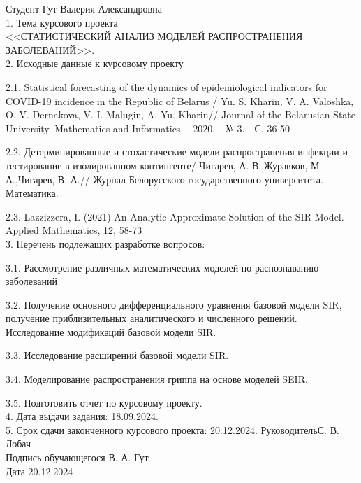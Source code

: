 \documentclass[a4paper, 14pt]{extreport}
\numberwithin{equation}{section}
\begin{document}
	\small{    Студент \quad Гут Валерия Александровна\\[2mm]
		1. Тема курсового проекта\\
		<<СТАТИСТИЧЕСКИЙ АНАЛИЗ МОДЕЛЕЙ РАСПРОСТРАНЕНИЯ ЗАБОЛЕВАНИЙ>>.\\[6mm]
		2. Исходные данные к курсовому проекту
		
		2.1. Statistical forecasting of the dynamics of epidemiological indicators for COVID-19 incidence in the Republic of Belarus / Yu. S. Kharin, V. A. Valoshka, O. V. Dernakova, V. I. Malugin, A. Yu. Kharin// Journal of the Belarusian State University. Mathematics and Informatics. - 2020. - № 3. - С. 36-50
		
		2.2. Детерминированные и стохастические модели распространения инфекции и тестирование в изолированном контингенте/ Чигарев, А. В.,Журавков, М. А.,Чигарев, В. А.// Журнал Белорусского государственного университета. Математика.
		
		2.3. Lazzizzera, I. (2021) An Analytic Approximate Solution of the SIR Model. Applied Mathematics, 12, 58-73\\[2mm]
		
		3. Перечень подлежащих разработке вопросов:
		
		3.1. Рассмотрение различных математических моделей по распознаванию  заболеваний
		
		3.2. Получение основного дифференциального уравнения базовой модели SIR, получение приблизительных аналитического и численного решений. Исследование модификаций базовой модели SIR.
		
		3.3. Исследование расширений базовой модели SIR.
		
		3.4. Моделирование распространения гриппа на основе моделей SEIR.
		
		3.5. Подготовить отчет по курсовому проекту.\\[1cm]
		4. Дата выдачи задания: 18.09.2024.\\[6mm]
		5. Срок сдачи законченного курсового проекта: 20.12.2024.
		\vfill
		\noindent Руководитель\hspace*{3cm}\underline{\hspace*{4cm}}\hspace*{4cm}С. В. Лобач\\[2mm]
		\noindent Подпись обучающегося\hspace*{1.21cm}\underline{\hspace*{4cm}} \hspace*{3.7cm} В. А. Гут\\[2mm]
		Дата \hspace*{12.5cm}20.12.2024     
	}\normalsize
	\newpage
	
\end{document}

